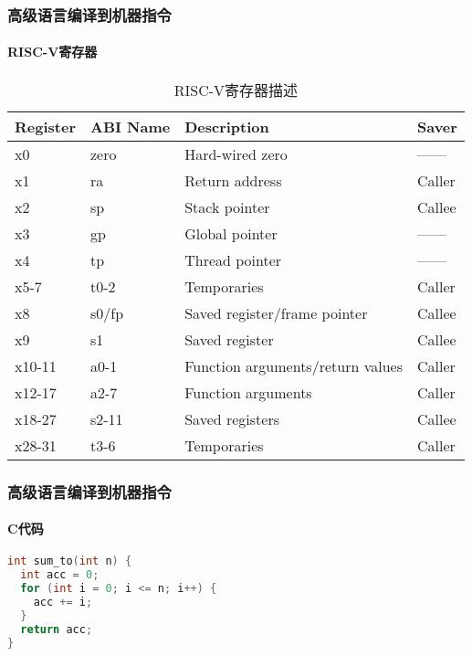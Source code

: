 \documentclass[UTF8]{ctexbeamer}
\begin{document}
\begin{frame}
	
	\frametitle{高级语言编译到机器指令}
	\framesubtitle{RISC-V寄存器}	
\begin{table}[h]
		\caption{RISC-V寄存器描述}
		\begin{tabular}{|l|l|l|l|}
			\hline
			Register & ABI Name & Description                      & Saver  \\\hline
			x0       & zero     & Hard-wired zero                  & ------ \\\hline
			x1       & ra       & Return address                   & Caller \\\hline
			x2       & sp       & Stack pointer                    & Callee \\\hline
			x3       & gp       & Global pointer                   & ------ \\\hline
			x4       & tp       & Thread pointer                   & ------ \\\hline
			x5-7     & t0-2     & Temporaries                      & Caller \\\hline
			x8       & s0/fp    & Saved register/frame pointer     & Callee \\\hline
			x9       & s1       & Saved register                   & Callee \\\hline
			x10-11   & a0-1     & Function arguments/return values & Caller \\\hline
			x12-17   & a2-7     & Function arguments               & Caller \\\hline
			x18-27   & s2-11    & Saved registers                  & Callee \\\hline
			x28-31   & t3-6     & Temporaries                      & Caller \\
			\hline
		\end{tabular}
\end{table}

\end{frame}



\begin{frame}[fragile]
	\frametitle{高级语言编译到机器指令}
	\framesubtitle{C代码}
	
\begin{lstlisting}[language = C]
int sum_to(int n) {
  int acc = 0;
  for (int i = 0; i <= n; i++) {
    acc += i;
  }
  return acc;
}
\end{lstlisting}
	
\end{frame}
\end{document}
